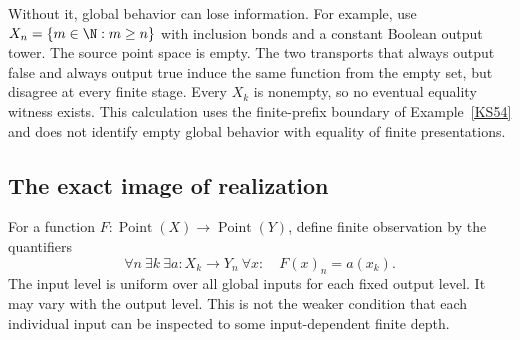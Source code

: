 Without it, global behavior can lose information. For example, use \(X_n=\{m\in\N:m\ge n\}\) with inclusion bonds and a constant Boolean output tower. The source point space is empty. The two transports that always output false and always output true induce the same function from the empty set, but disagree at every finite stage. Every \(X_k\) is nonempty, so no eventual equality witness exists. This calculation uses the finite-prefix boundary of Example~\ref{KS54} and does not identify empty global behavior with equality of finite presentations.

\subsection{The exact image of realization}
For a function \(F:\operatorname{Point}(X)\to\operatorname{Point}(Y)\), define finite observation by the quantifiers
\begin{equation}\label{eq:finite-observation}
 \forall n\ \exists k\ \exists a:X_k\to Y_n\ \forall x:\quad
 F(x)_n=a(x_k).
\end{equation}
The input level is uniform over all global inputs for each fixed output level. It may vary with the output level. This is not the weaker condition that each individual input can be inspected to some input-dependent finite depth.

